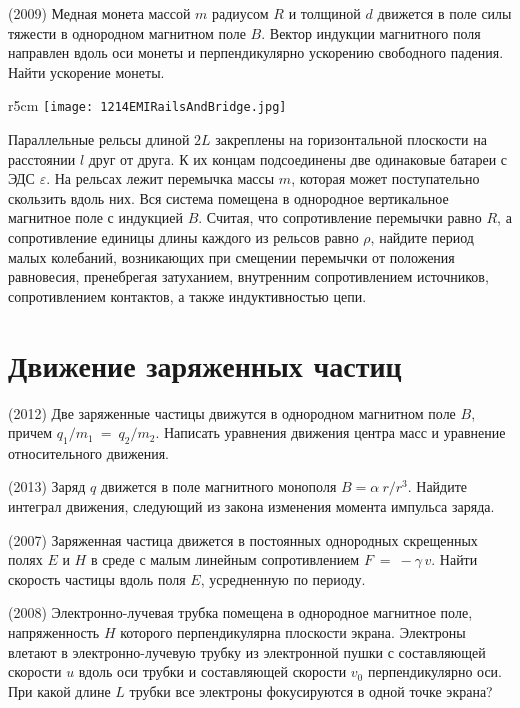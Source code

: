 \AddProb (2009) Медная монета массой $m$ радиусом $R$ и толщиной $d$ движется в поле силы тяжести в однородном магнитном поле $B$. 
Вектор индукции магнитного поля направлен вдоль оси монеты и перпендикулярно ускорению свободного падения. Найти ускорение монеты.

\begin{wrapfigure}{r}{5cm}
\texttt{[image: 1214EMIRailsAndBridge.jpg]}
\end{wrapfigure}

\AddProb Параллельные рельсы длиной $2L$ закреплены на горизонтальной плоскости на расстоянии $l$ друг от друга. 
К их концам подсоединены две одинаковые батареи с ЭДС {\Large $\varepsilon$}. На рельсах лежит перемычка массы $m$, 
которая может поступательно скользить вдоль них. Вся система помещена в однородное вертикальное магнитное поле с индукцией $B$. 
Считая, что сопротивление перемычки равно $R$, а сопротивление единицы длины каждого из рельсов равно $\rho$, найдите период малых колебаний, 
возникающих при смещении перемычки от положения равновесия, пренебрегая затуханием, внутренним сопротивлением источников, 
сопротивлением контактов, а также индуктивностью цепи.


\section{Движение заряженных частиц}

\AddProb (2012) Две заряженные частицы движутся в однородном магнитном поле $B$, причем $q_1/m_1~ =~q_2/m_2$. 
Написать уравнения движения центра масс и уравнение относительного движения.

\AddProb (2013) Заряд $q$ движется в поле магнитного монополя $B = \alpha~r/r^3$. 
Найдите интеграл движения, следующий из закона изменения момента импульса заряда.

\AddProb (2007) Заряженная частица движется в постоянных однородных скрещенных полях $E$ и $H$ в среде 
с малым линейным сопротивлением $F~=~-\gamma\,v$. Найти скорость частицы вдоль поля $E$, усредненную по периоду.

\AddProb (2008) Электронно-лучевая трубка помещена в однородное магнитное поле, напряженность $H$ которого перпендикулярна плоскости экрана. 
Электроны влетают в электронно-лучевую трубку из электронной пушки с составляющей скорости $u$ вдоль оси трубки и 
составляющей скорости $v_0$ перпендикулярно оси. При какой длине $L$ трубки все электроны фокусируются в одной точке экрана?


